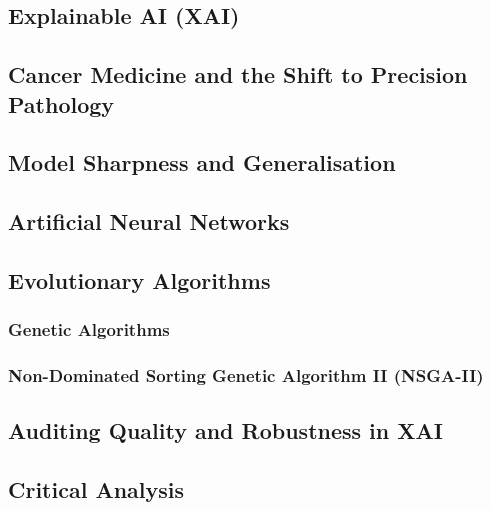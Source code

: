 
\subsection{Explainable AI (XAI)}


\subsection{Cancer Medicine and the Shift to Precision Pathology}


\subsection{Model Sharpness and Generalisation}


\subsection{Artificial Neural Networks}


\subsection{Evolutionary Algorithms}


\subsubsection{Genetic Algorithms}


\subsubsection{Non-Dominated Sorting Genetic Algorithm II (NSGA-II)}


\subsection{Auditing Quality and Robustness in XAI}


\subsection{Critical Analysis}
